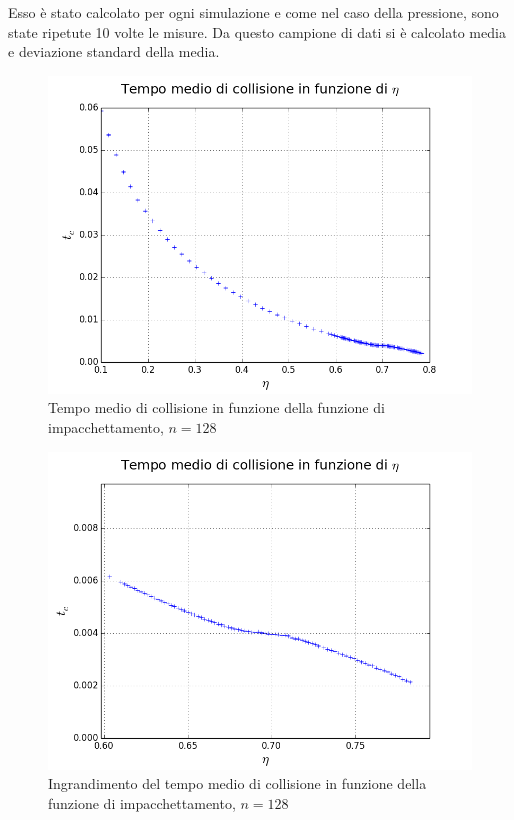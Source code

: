 Esso è stato calcolato per ogni simulazione e come nel caso della pressione, sono state ripetute 10 volte le misure. Da questo campione di dati si è calcolato media e deviazione standard della media.


\begin{figure}[h!]
	\centering
	\includegraphics[scale=0.48]{sfere2D/tc.png}
	\caption{Tempo medio di collisione in funzione della funzione di impacchettamento, $n=128$}
	\end{figure}

\begin{figure}[h!]
	\centering
	\includegraphics[scale=0.48]{sfere2D/tczoom.png}
	\caption{Ingrandimento del tempo medio di collisione in funzione della funzione di impacchettamento, $n=128$}
	\end{figure}

